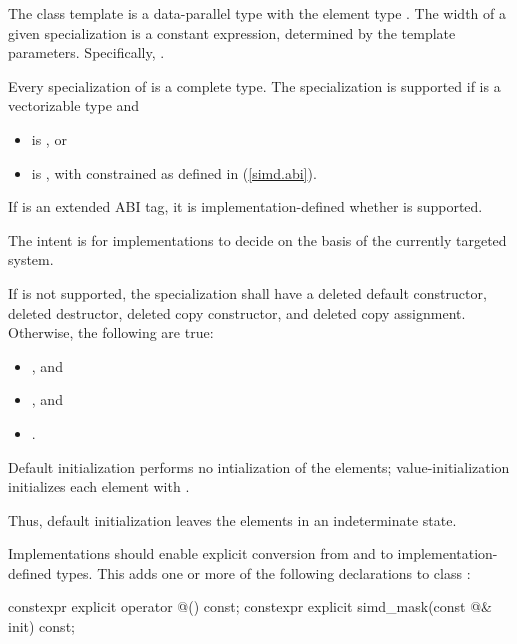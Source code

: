 \pnum
The class template  is a data-parallel type with the element type . The width of a given  specialization is a constant expression, determined by the template parameters. Specifically, .

\pnum
Every specialization of  is a complete type. The specialization  is supported if  is a vectorizable type and
\begin{itemize}
  \item {} is , or
  \item {} is , with  constrained as defined in (\ref{simd.abi}).
\end{itemize}

If  is an extended ABI tag, it is implementation-defined whether  is supported. \begin{note}The intent is for implementations to decide on the basis of the currently targeted system.\end{note}

If  is not supported, the specialization shall have a deleted default constructor, deleted destructor, deleted copy constructor, and deleted copy assignment.
Otherwise, the following are true:
\begin{itemize}
  \item {}, and
  \item {}, and
  \item {}.
\end{itemize}

\pnum
Default initialization performs no intialization of the elements; value-initialization initializes each element with . \begin{note}Thus, default initialization leaves the elements in an indeterminate state.\end{note}

\pnum
Implementations should enable explicit conversion from and to implementation-defined types. This adds one or more of the following declarations to class :

\begin{codeblock}
constexpr explicit operator @\impdef@() const;
constexpr explicit simd_mask(const @\impdef@& init) const;
\end{codeblock}

